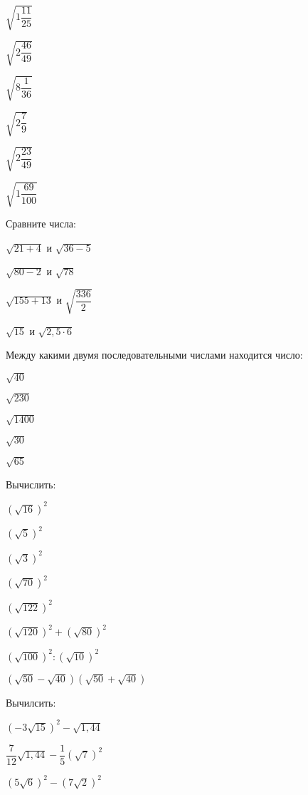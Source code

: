 \begin{class}[number=2]
\begin{listofex}
		\begin{enumcols}[itemcolumns=6]
			\item \( \sqrt{1\dfrac{11}{25}} \)
			\item \( \sqrt{2\dfrac{46}{49}} \)
			\item \( \sqrt{8\dfrac{1}{36}} \)
			\item \( \sqrt{2\dfrac{7}{9}} \)
			\item \( \sqrt{2\dfrac{23}{49}} \)
			\item \( \sqrt{1\dfrac{69}{100}} \)
		\end{enumcols}
		\item Сравните числа: 
		\begin{enumcols}[itemcolumns=2]
			\item \( \sqrt{21+4} \) и \( \sqrt{36-5} \)
			\item \( \sqrt{80-2} \) и \( \sqrt{78} \)
			\item \( \sqrt{155+13} \) и \( \sqrt{\dfrac{336}{2}} \)
			\item \( \sqrt{15} \) и \( \sqrt{2,5\cdot6} \)
		\end{enumcols}
		\item Между какими двумя последовательными числами находится число:
		\begin{enumcols}[itemcolumns=5]
			\item \( \sqrt{40} \)
			\item \( \sqrt{230} \)
			\item \( \sqrt{1400} \)
			\item \( \sqrt{30} \)
			\item \( \sqrt{65} \)
		\end{enumcols}	
		\item Вычислить:
		\begin{enumcols}[itemcolumns=2]
			\item \( (\sqrt{16})^2 \)
			\item \( (\sqrt{5})^2 \)
			\item \( (\sqrt{3})^2 \)
			\item \( (\sqrt{70})^2 \)
			\item \( (\sqrt{122})^2 \)
			\item \( (\sqrt{120})^2+(\sqrt{80})^2 \)
			\item \( (\sqrt{100})^2:(\sqrt{10})^2 \)
			\item \( (\sqrt{50}-\sqrt{40})(\sqrt{50}+\sqrt{40}) \)
		\end{enumcols}
		\item Вычилсить:
		\begin{enumcols}[itemcolumns=3]
			\item \( (-3\sqrt{15})^2-\sqrt{1,44} \)
			\item \( \dfrac{7}{12}\sqrt{1,44}-\dfrac{1}{5}(\sqrt{7})^2 \)
			\item \( (5\sqrt{6})^2-(7\sqrt{2})^2 \)
		\end{enumcols}
	\end{listofex}
\end{class}
